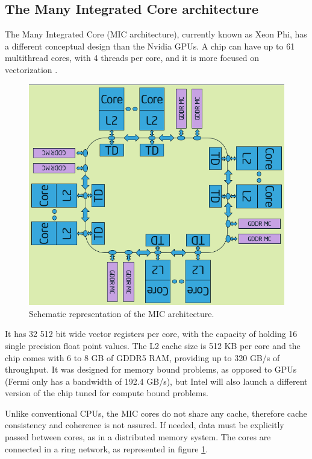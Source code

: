 \subsection{The \intel Many Integrated Core architecture}

The \intel Many Integrated Core (MIC architecture), currently known as \intel Xeon Phi, has a different conceptual design than the Nvidia GPUs. A chip can have up to 61 multithread cores, with 4 threads per core, and it is more focused on vectorization \cite{Intel:MIC:Elgar}. 

\begin{figure}[!htp]
	\begin{center}
		\includegraphics[scale=0.5]{../../common/img/mic_arch.png}
		\caption{Schematic representation of the \intel MIC architecture.}
		\label{fig:mic}
	\end{center}
\end{figure}

It has 32 512 bit wide vector registers per core, with the capacity of holding 16 single precision float point values. The L2 cache size is 512 KB per core and the chip comes with 6 to 8 GB of GDDR5 RAM, providing up to 320 GB/s of throughput. It was designed for memory bound problems, as opposed to GPUs (Fermi only has a bandwidth of 192.4 GB/s), but Intel will also launch a different version of the chip tuned for compute bound problems.

Unlike conventional CPUs, the MIC cores do not share any cache, therefore cache consistency and coherence is not assured. If needed, data must be explicitly passed between cores, as in a distributed memory system. The cores are connected in a ring network, as represented in figure \ref{fig:mic}.

